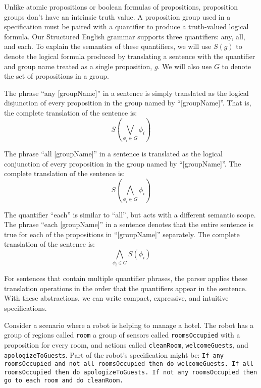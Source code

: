 Unlike atomic propositions or boolean formulas of propositions, proposition groups don't have an intrinsic truth value. A proposition group used in a specification must be paired with a quantifier to produce a truth-valued logical formula. Our Structured English grammar supports three quantifiers: any, all, and each. To explain the semantics of these quantifiers, we will use $S(g)$ to denote the logical formula produced by translating a sentence with the quantifier and group name treated as a single proposition, $g$. We will also use $G$ to denote the set of propositions in a group. 
\par
The phrase ``any [groupName]'' in a sentence is simply translated as the logical disjunction of every proposition in the group named by ``[groupName]''. That is, the complete translation of the sentence is: 
\begin{equation*}
	S( \bigvee \limits_{\phi_i \in G} \phi_i )
\end{equation*}
\par
The phrase ``all [groupName]'' in a sentence is translated as the logical conjunction of every proposition in the group named by ``[groupName]''. The complete translation of the sentence is: 
\begin{equation*}
	S( \bigwedge \limits_{\phi_i \in G} \phi_i )
\end{equation*}
\par
The quantifier ``each'' is similar to ``all'', but acts with a different semantic scope. The phrase ``each [groupName]'' in a sentence denotes that the entire sentence is true for each of the propositions in ``[groupName]'' separately. The complete translation of the sentence is:
\begin{equation*}
 	\bigwedge\limits_{\phi_i \in G} S(\phi_i)
\end{equation*}
\par
For sentences that contain multiple quantifier phrases, the parser applies these translation operations in the order that the quantifiers appear in the sentence. With these abstractions, we can write compact, expressive, and intuitive specifications. 
\par
\begin{myExample}\label{Ex:quantifiers} 	
	Consider a scenario where a robot is helping to manage a hotel. The robot has a group of regions called \texttt{room} a group of sensors called \texttt{roomsOccupied} with a proposition for every room, and actions called \texttt{cleanRoom}, \texttt{welcomeGuests}, and \texttt{apologizeToGuests}. Part of the robot's specification might be: \texttt{If any roomsOccupied and not all roomsOccupied then do welcomeGuests. If all roomsOccupied then do apologizeToGuests. If not any roomsOccupied then go to each room and do cleanRoom. } 
\end{myExample}

